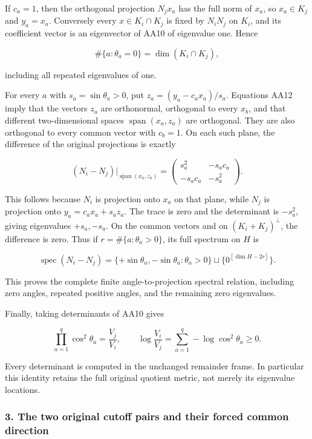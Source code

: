 If \(c_a=1\), then the orthogonal projection \(N_jx_a\) has the full norm of \(x_a\), so \(x_a\in K_j\) and \(y_a=x_a\). Conversely every \(x\in K_i\cap K_j\) is fixed by \(N_iN_j\) on \(K_i\), and its coefficient vector is an eigenvector of AA10 of eigenvalue one. Hence

\[
\#\{a:\theta_a=0\}=\dim(K_i\cap K_j),
\tag{AA13}
\]

including all repeated eigenvalues of one.

For every \(a\) with \(s_a=\sin\theta_a>0\), put \(z_a=(y_a-c_ax_a)/s_a\). Equations AA12 imply that the vectors \(z_a\) are orthonormal, orthogonal to every \(x_b\), and that different two-dimensional spaces \(\operatorname{span}(x_a,z_a)\) are orthogonal. They are also orthogonal to every common vector with \(c_b=1\). On each such plane, the difference of the original projections is exactly

\[
(N_i-N_j)|_{\operatorname{span}(x_a,z_a)}
=\begin{pmatrix}s_a^2&-s_ac_a\\-s_ac_a&-s_a^2\end{pmatrix}.
\tag{AA14}
\]

This follows because \(N_i\) is projection onto \(x_a\) on that plane, while \(N_j\) is projection onto \(y_a=c_ax_a+s_az_a\). The trace is zero and the determinant is \(-s_a^2\), giving eigenvalues \(+s_a,-s_a\). On the common vectors and on \((K_i+K_j)^\perp\), the difference is zero. Thus if \(r=\#\{a:\theta_a>0\}\), its full spectrum on \(H\) is

\[
\operatorname{spec}(N_i-N_j)
=\{+\sin\theta_a,-\sin\theta_a:\theta_a>0\}
 \sqcup\{0^{[\dim H-2r]}\}.
\tag{AA15}
\]

This proves the complete finite angle-to-projection spectral relation, including zero angles, repeated positive angles, and the remaining zero eigenvalues.

Finally, taking determinants of AA10 gives

\[
\prod_{a=1}^q\cos^2\theta_a
=\frac{V_j}{V_i},\qquad
\log\frac{V_i}{V_j}
=\sum_{a=1}^q -\log\cos^2\theta_a\ge0.
\tag{AA16}
\]

Every determinant is computed in the unchanged remainder frame. In particular this identity retains the full original quotient metric, not merely its eigenvalue locations.

\subsubsection{3. The two original cutoff pairs and their forced common direction}\label{endpoint-all_degree_angle_review--the-two-original-cutoff-pairs-and-their-forced-common-direction}

